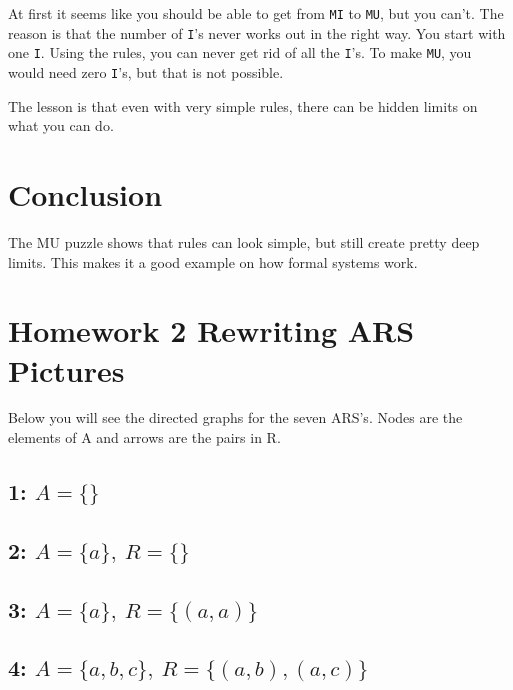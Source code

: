\documentclass[12pt]{article}
\begin{document}
At first it seems like you should be able to get from \texttt{MI} to
\texttt{MU}, but you can't. The reason is that the number of
\texttt{I}'s never works out in the right way. You start with one \texttt{I}.
Using the rules, you can never get rid of all the \texttt{I}'s. To make
\texttt{MU}, you would need zero \texttt{I}'s, but that is not possible.  

The lesson is that even with very simple rules, there can be hidden limits on what you can do.

\section{Conclusion}
The MU puzzle shows that rules can look simple, but still create pretty deep limits.
This makes it a good example on how formal systems work.

\newpage
\section{Homework 2 Rewriting ARS Pictures}

Below you will see the directed graphs for the seven ARS's. Nodes are the elements of A and arrows are the pairs in R.

\subsection{1: $A=\{\}$}
\begin{tikzpicture}
\end{tikzpicture}

\subsection{2: $A=\{a\},\ R=\{\}$}

\subsection{3: $A=\{a\},\ R=\{(a,a)\}$}

\subsection{4: $A=\{a,b,c\},\ R=\{(a,b),(a,c)\}$}
\end{document}
